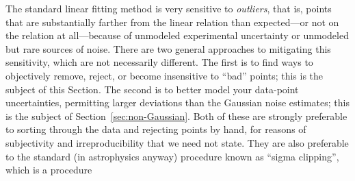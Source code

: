 \documentclass[12pt,twoside]{article}
\newcommand{\sectionname}{Section}
\begin{document}
The standard linear fitting method is very sensitive to
\emph{outliers}, that is, points that are substantially farther from
the linear relation than expected---or not on the relation at
all---because of unmodeled experimental uncertainty or unmodeled but
rare sources of noise.  There are two general approaches to mitigating
this sensitivity, which are not necessarily different.  The first is
to find ways to objectively remove, reject, or become insensitive to
``bad'' points; this is the subject of this \sectionname.  The second
is to better model your data-point uncertainties, permitting larger
deviations than the Gaussian noise estimates; this is the subject of
\sectionname~\ref{sec:non-Gaussian}.  Both of these are strongly
preferable to sorting through the data and rejecting points by hand,
for reasons of subjectivity and irreproducibility that we need not
state.  They are also preferable to the standard (in astrophysics
anyway) procedure known as ``sigma clipping'', which is a procedure
\end{document}
